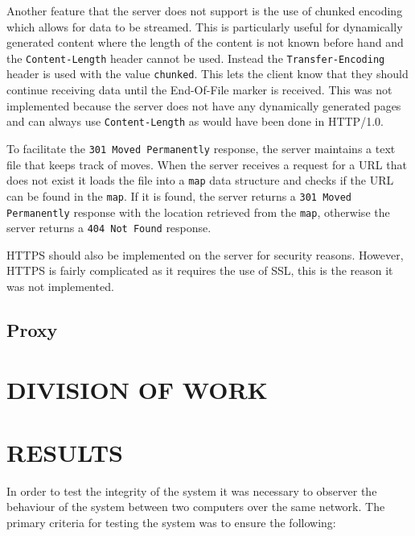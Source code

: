 \documentclass[10pt,twocolumn]{witseiepaper}
\begin{document}
	Another feature that the server does not support is the use of chunked encoding which allows for data to be streamed. This is particularly useful for dynamically generated content where the length of the content is not known before hand and the \texttt{Content-Length} header cannot be used. Instead the \texttt{Transfer-Encoding} header is used with the value \texttt{chunked}. This lets the client know that they should continue receiving data until the End-Of-File marker is received. This was not implemented because the server does not have any dynamically generated pages and can always use \texttt{Content-Length} as would have been done in HTTP/1.0.

	To facilitate the \texttt{301 Moved Permanently} response, the server maintains a text file that keeps track of moves. When the server receives a request for a URL that does not exist it loads the file into a \texttt{map} data structure and checks if the URL can be found in the \texttt{map}. If it is found, the server returns a \texttt{301 Moved Permanently} response with the location retrieved from the \texttt{map}, otherwise the server returns a \texttt{404 Not Found} response.	

	HTTPS should also be implemented on the server for security reasons. However, HTTPS is fairly complicated as it requires the use of SSL, this is the reason it was not implemented. 

	\subsection{Proxy}

\section{DIVISION OF WORK}

\section{RESULTS}

	In order to test the integrity of the system it was necessary to observer the behaviour of the system between two computers over the same network. The primary criteria for testing the system was to ensure the following:
\end{document}
